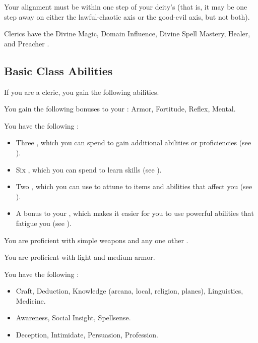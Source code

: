      Your alignment must be within one step of your deity's (that is, it may be one step away on either the lawful-chaotic axis or the good-evil axis, but not both).

     Clerics have the Divine Magic, Domain Influence, Divine Spell Mastery, Healer, and Preacher .

    \subsection{Basic Class Abilities}
        If you are a cleric, you gain the following abilities.

        You gain the following bonuses to your :  Armor,  Fortitude,  Reflex,  Mental.

         You have the following :
        \begin{itemize}
            \item Three , which you can spend to gain additional abilities or proficiencies (see ).
            \item Six , which you can spend to learn skills (see ).
            \item Two , which you can use to attune to items and abilities that affect you (see ).
            \item A  bonus to your , which makes it easier for you to use powerful abilities that fatigue you (see ).
        \end{itemize}

        You are proficient with simple weapons and any one other .

        You are proficient with light and medium armor.

        You have the following :
        \begin{itemize}
            \item {} Craft, Deduction, Knowledge (arcana, local, religion, planes), Linguistics, Medicine.
            \item {} Awareness, Social Insight, Spellsense.
            \item {} Deception, Intimidate, Persuasion, Profession.
        \end{itemize}

